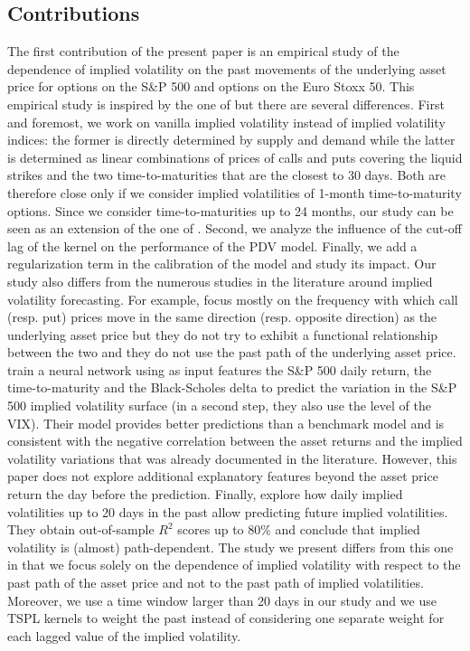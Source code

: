 \subsection{Contributions}
The first contribution of the present paper is an empirical study of the dependence of implied volatility on the past movements of the underlying asset price for options on the S\&P 500 and options on the Euro Stoxx 50. This empirical study is inspired by the one of \cite{guyon2022volatility} but there are several differences. First and foremost, we work on vanilla implied volatility instead of implied volatility indices: the former is directly determined by supply and demand while the latter is determined as linear combinations of prices of calls and puts covering the liquid strikes and the two time-to-maturities that are the closest to 30 days. Both are therefore close only if we consider implied volatilities of 1-month time-to-maturity options. Since we consider time-to-maturities up to 24 months, our study can be seen as an extension of the one of \cite{guyon2022volatility}. Second, we analyze the influence of the cut-off lag of the kernel on the performance of the PDV model. Finally, we add a regularization term in the calibration of the model and study its impact. Our study also differs from the numerous studies in the literature around implied volatility forecasting. For example, \cite{bakshi2000call} focus mostly on the frequency with which call (resp. put) prices move in the same direction (resp. opposite direction) as the underlying asset price but they do not try to exhibit a functional relationship between the two and they do not use the past path of the underlying asset price. \cite{cao2020} train a neural network using as input features the S\&P 500 daily return, the time-to-maturity and the Black-Scholes delta to predict the variation in the S\&P 500 implied volatility surface (in a second step, they also use the level of the VIX). Their model provides better predictions than a benchmark model and is consistent with the negative correlation between the asset returns and the implied volatility variations that was already documented in the literature. However, this paper does not explore additional explanatory features beyond the asset price return the day before the prediction. Finally, \cite{wen2024implied} explore how daily implied volatilities up to 20 days in the past allow predicting future implied volatilities. They obtain out-of-sample $R^2$ scores up to 80\% and conclude that implied volatility is (almost) path-dependent. The study we present differs from this one in that we focus solely on the dependence of implied volatility with respect to the past path of the asset price and not to the past path of implied volatilities. Moreover, we use a time window larger than 20 days in our study and we use TSPL kernels to weight the past instead of considering one separate weight for each lagged value of the implied volatility.  \\

